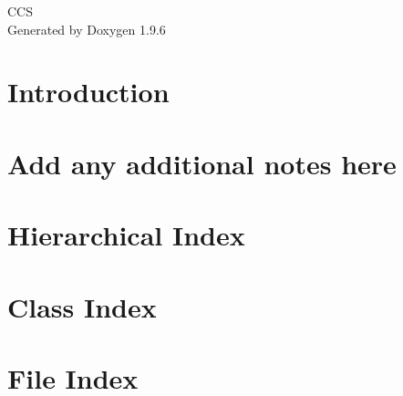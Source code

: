 \documentclass[twoside]{book}
\newcommand{\+}{\discretionary{\mbox{\scriptsize$\hookleftarrow$}}{}{}}
\newcommand{\clearemptydoublepage}{%
    \newpage{\pagestyle{empty}\cleardoublepage}%
  }
\begin{document}
  \raggedbottom
    \hypersetup{pageanchor=false,
                bookmarksnumbered=true,
                pdfencoding=unicode
               }
  \begin{titlepage}
  \vspace*{7cm}
  \begin{center}%
  {\Large CCS}\\
  \vspace*{1cm}
  {\large Generated by Doxygen 1.9.6}\\
  \end{center}
  \end{titlepage}
  \clearemptydoublepage
  \tableofcontents
  \clearemptydoublepage
  \hypersetup{pageanchor=true}
\chapter{Introduction}
\label{md_py__r_e_a_d_m_e}

\chapter{Add any additional notes here}
\label{md__r_e_a_d_m_e}

\chapter{Hierarchical Index}

\chapter{Class Index}

\chapter{File Index}

\end{document}
